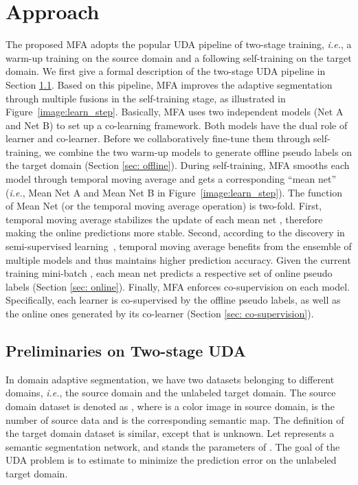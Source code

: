 \documentclass{bmvc2k}
\begin{document}
\section{Approach}
The proposed MFA adopts the popular UDA pipeline of two-stage training, \emph{i.e.}, a warm-up training on the source domain and a following self-training on the target domain. We first give a formal description of the two-stage UDA pipeline in Section \ref{sec: pre}.
Based on this pipeline, MFA improves the adaptive segmentation through multiple fusions in the self-training stage, as illustrated in Figure~\ref{image:learn_step}. Basically, MFA uses two independent models (Net A and Net B) to set up a co-learning framework. Both models have the dual role of learner and co-learner. Before we collaboratively fine-tune them through self-training, we combine the two warm-up models to generate offline pseudo labels on the target domain (Section \ref{sec: offline}). During self-training, MFA smooths each model through temporal moving average and gets a corresponding ``mean net'' (\emph{i.e.}, Mean Net A and Mean Net B in Figure~\ref{image:learn_step}).  The function of Mean Net (or the temporal moving average operation) is two-fold. First, temporal moving average stabilizes the update of each mean net , therefore making the online predictions more stable. Second, according to the discovery in semi-supervised learning~\cite{tarvainen2017mean}, temporal moving average benefits from the ensemble of multiple models and thus maintains higher prediction accuracy. Given the current training mini-batch , each mean net predicts a respective set of online pseudo labels (Section \ref{sec: online}). Finally, MFA enforces co-supervision on each model. Specifically, each learner is co-supervised by the offline pseudo labels, as well as the online ones generated by its co-learner (Section \ref{sec: co-supervision}).


\subsection{Preliminaries on Two-stage UDA} \label{sec: pre}
In domain adaptive segmentation, we have two datasets belonging to different domains, \emph{i.e.}, the source domain and the unlabeled target domain. The source domain dataset is denoted as , where  is a color image in source domain,  is the number of source data and  is the corresponding semantic map. The definition of the target domain dataset  is similar, except that  is unknown. Let  represents a semantic segmentation network, and  stands the parameters of . The goal of the UDA problem is to estimate  to minimize the prediction error on the unlabeled target domain.  
\end{document}

